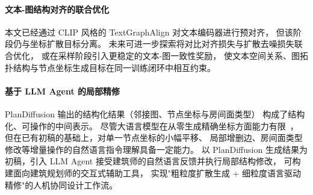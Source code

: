 \paragraph{文本-图结构对齐的联合优化}
本文已经通过 CLIP 风格的 TextGraphAlign 对文本编码器进行预对齐，
但该阶段仍与坐标扩散目标分离。
未来可进一步探索将对比对齐损失与扩散去噪损失联合优化，
或在采样阶段引入更稳定的文本-图一致性奖励，
使文本空间关系、图拓扑结构与节点坐标生成目标在同一训练闭环中相互约束。

\paragraph{基于 LLM Agent 的局部精修}
PlanDiffusion 输出的结构化结果（邻接图、节点坐标与房间面类型）
构成了结构化、可操作的中间表示。
尽管大语言模型在从零生成精确坐标方面能力有限~\cite{feng2023layoutgpt}，
但在已有初稿的基础上，对单一节点坐标的小幅平移、
局部增删边、房间面类型修改等增量操作的自然语言指令理解具备一定能力。
以 PlanDiffusion 生成结果为初稿，引入 LLM Agent 接受建筑师的自然语言反馈并执行局部结构修改，
可构建面向建筑规划师的交互式辅助工具，
实现"粗粒度扩散生成 + 细粒度语言驱动精修"的人机协同设计工作流。

